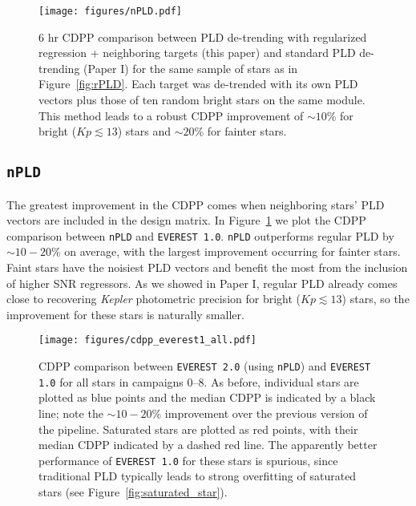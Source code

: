 \documentclass[]{emulateapj}
\newcommand{\Kp}{\ensuremath{Kp}}
\begin{document}
\begin{figure}[hbt]
  \begin{center}
      \texttt{[image: figures/nPLD.pdf]}
       \caption{6 hr CDPP comparison between PLD de-trending with regularized regression + neighboring targets
                (this paper) and standard PLD de-trending (Paper I) for the same sample of stars as in Figure~\ref{fig:rPLD}.
                Each target was de-trended with its own PLD vectors plus those of ten random bright stars
                on the same module. This method leads to a robust CDPP improvement of ${\sim}10$\% for bright ($\Kp \lesssim 13$) stars
                and ${\sim}20$\% for fainter stars.}
     \label{fig:nPLD}
  \end{center}
\end{figure}

\subsection{\texttt{nPLD}}
The greatest improvement in the CDPP comes when neighboring stars' PLD vectors are included
in the design matrix. In Figure~\ref{fig:nPLD} we plot the CDPP comparison between \texttt{nPLD}
and \texttt{EVEREST 1.0}. \texttt{nPLD} outperforms regular PLD by ${\sim}10-20\%$
on average, with the largest improvement occurring for fainter stars. Faint stars have the
noisiest PLD vectors and benefit the most from the inclusion of higher SNR regressors.
As we showed in Paper I, regular PLD already comes close to recovering \emph{Kepler} photometric
precision for bright ($\Kp \lesssim 13$) stars, so the improvement for these stars is naturally
smaller.\\[0em]

\begin{figure}[hbt]
  \begin{center}
      \texttt{[image: figures/cdpp\_everest1\_all.pdf]}
       \caption{CDPP comparison between \texttt{EVEREST 2.0} (using \texttt{nPLD}) and \texttt{EVEREST 1.0} for all stars in campaigns 0--8.
       As before, individual stars are plotted as blue points and the median CDPP is indicated by a black line; note
       the ${\sim}10-20$\% improvement over the previous version of the pipeline. Saturated
       stars are plotted as red points, with their median CDPP indicated by a dashed red line. The apparently
       better performance of \texttt{EVEREST 1.0} for these stars is spurious, since traditional PLD typically
       leads to strong overfitting of saturated stars (see Figure~\ref{fig:saturated_star}).}
     \label{fig:cdpp_everest1_all}
  \end{center}
\end{figure}
\end{document}
